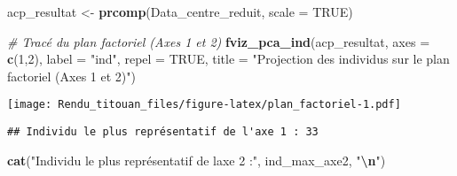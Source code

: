 \documentclass[
]{article}
\newenvironment{Shaded}{\begin{snugshade}}{\end{snugshade}}
\newcommand{\AttributeTok}[1]{\textcolor[rgb]{0.13,0.29,0.53}{#1}}
\newcommand{\CommentTok}[1]{\textcolor[rgb]{0.56,0.35,0.01}{\textit{#1}}}
\newcommand{\ConstantTok}[1]{\textcolor[rgb]{0.56,0.35,0.01}{#1}}
\newcommand{\DecValTok}[1]{\textcolor[rgb]{0.00,0.00,0.81}{#1}}
\newcommand{\FunctionTok}[1]{\textcolor[rgb]{0.13,0.29,0.53}{\textbf{#1}}}
\newcommand{\NormalTok}[1]{#1}
\newcommand{\OtherTok}[1]{\textcolor[rgb]{0.56,0.35,0.01}{#1}}
\newcommand{\SpecialCharTok}[1]{\textcolor[rgb]{0.81,0.36,0.00}{\textbf{#1}}}
\newcommand{\StringTok}[1]{\textcolor[rgb]{0.31,0.60,0.02}{#1}}
\begin{document}
\begin{Shaded}
\begin{Highlighting}[]
\NormalTok{acp\_resultat }\OtherTok{\textless{}{-}} \FunctionTok{prcomp}\NormalTok{(Data\_centre\_reduit, }\AttributeTok{scale =} \ConstantTok{TRUE}\NormalTok{)}

\CommentTok{\# Tracé du plan factoriel (Axes 1 et 2)}
\FunctionTok{fviz\_pca\_ind}\NormalTok{(acp\_resultat, }\AttributeTok{axes =} \FunctionTok{c}\NormalTok{(}\DecValTok{1}\NormalTok{,}\DecValTok{2}\NormalTok{), }
             \AttributeTok{label =} \StringTok{"ind"}\NormalTok{,  }
             \AttributeTok{repel =} \ConstantTok{TRUE}\NormalTok{,    }
             \AttributeTok{title =} \StringTok{"Projection des individus sur le plan factoriel (Axes 1 et 2)"}\NormalTok{)}
\end{Highlighting}
\end{Shaded}

\texttt{[image: Rendu\_titouan\_files/figure-latex/plan\_factoriel-1.pdf]}

\begin{Shaded}
\end{Shaded}

\begin{verbatim}
## Individu le plus représentatif de l'axe 1 : 33
\end{verbatim}

\begin{Shaded}
\begin{Highlighting}[]
\FunctionTok{cat}\NormalTok{(}\StringTok{"Individu le plus représentatif de l\textquotesingle{}axe 2 :"}\NormalTok{, ind\_max\_axe2, }\StringTok{"}\SpecialCharTok{\textbackslash{}n}\StringTok{"}\NormalTok{)}
\end{Highlighting}
\end{Shaded}
\end{document}
